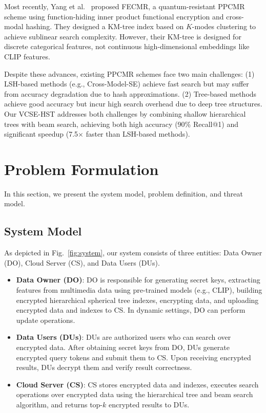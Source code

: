 \documentclass[journal]{IEEEtran}
\begin{document}
Most recently, Yang et al.~\cite{yang2025secure} proposed FECMR, a quantum-resistant PPCMR scheme using function-hiding inner product functional encryption and cross-modal hashing. They designed a KM-tree index based on $K$-modes clustering to achieve sublinear search complexity. However, their KM-tree is designed for discrete categorical features, not continuous high-dimensional embeddings like CLIP features.

Despite these advances, existing PPCMR schemes face two main challenges: (1) LSH-based methods (e.g., Cross-Model-SE) achieve fast search but may suffer from accuracy degradation due to hash approximations. (2) Tree-based methods achieve good accuracy but incur high search overhead due to deep tree structures. Our VCSE-HST addresses both challenges by combining shallow hierarchical trees with beam search, achieving both high accuracy (90\% Recall@1) and significant speedup (7.5$\times$ faster than LSH-based methods).

\section{Problem Formulation}
\label{sec:formulation}

In this section, we present the system model, problem definition, and threat model.

\subsection{System Model}

As depicted in Fig.~\ref{fig:system}, our system consists of three entities: Data Owner (DO), Cloud Server (CS), and Data Users (DUs).

\begin{itemize}
    \item \textbf{Data Owner (DO)}: DO is responsible for generating secret keys, extracting features from multimedia data using pre-trained models (e.g., CLIP), building encrypted hierarchical spherical tree indexes, encrypting data, and uploading encrypted data and indexes to CS. In dynamic settings, DO can perform update operations.

    \item \textbf{Data Users (DUs)}: DUs are authorized users who can search over encrypted data. After obtaining secret keys from DO, DUs generate encrypted query tokens and submit them to CS. Upon receiving encrypted results, DUs decrypt them and verify result correctness.

    \item \textbf{Cloud Server (CS)}: CS stores encrypted data and indexes, executes search operations over encrypted data using the hierarchical tree and beam search algorithm, and returns top-$k$ encrypted results to DUs.
\end{itemize}
\end{document}
